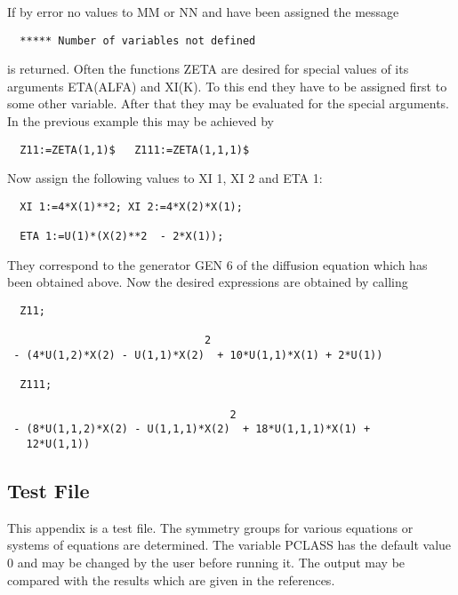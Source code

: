If by error no values to MM or NN and have been assigned the message

\begin{verbatim}
  ***** Number of variables not defined
\end{verbatim}

is returned. Often the functions ZETA are desired for special values
of its arguments ETA(ALFA) and XI(K). To this end they have to be
assigned first to some other variable. After that they may be
evaluated for the special arguments. In the previous example this may
be achieved by

\begin{verbatim}
  Z11:=ZETA(1,1)$   Z111:=ZETA(1,1,1)$
\end{verbatim}

Now assign the following values to XI 1, XI 2 and ETA 1:

\begin{verbatim}
  XI 1:=4*X(1)**2; XI 2:=4*X(2)*X(1);

  ETA 1:=U(1)*(X(2)**2  - 2*X(1));
\end{verbatim}

They correspond to the generator GEN 6 of the diffusion equation which
has been obtained above. Now the desired expressions are obtained by
calling

\begin{verbatim}
  Z11;

                               2
 - (4*U(1,2)*X(2) - U(1,1)*X(2)  + 10*U(1,1)*X(1) + 2*U(1))

  Z111;

                                   2
 - (8*U(1,1,2)*X(2) - U(1,1,1)*X(2)  + 18*U(1,1,1)*X(1) +
   12*U(1,1))
\end{verbatim}


\subsection{Test File}

This appendix is a test file. The symmetry groups for various
equations or systems of equations are determined. The variable PCLASS
has the default value 0 and may be changed by the user before running
it. The output may be compared with the results which are given in the
references.


